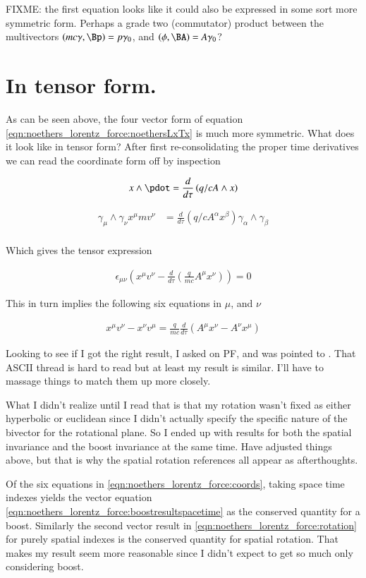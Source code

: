 FIXME: the first equation looks like it could also be expressed in some sort more symmetric form.  Perhaps a grade two (commutator) product between the multivectors $(mc\gamma, \Bp) = p \gamma_0$, and $(\phi, \BA) = A \gamma_0$?

\section{In tensor form. }

As can be seen above, the four vector form of equation \ref{eqn:noethers_lorentz_force:noethersLxTx} is much more symmetric.  What does it look like in 
tensor form?  After first re-consolidating the proper time derivatives we can read the coordinate form off by inspection

\begin{align*}
x \wedge \pdot &= \frac{d}{d\tau} \left( q/c A \wedge x \right) \\
\end{align*}

\begin{align*}
\gamma_\mu \wedge \gamma_\nu x^\mu m v^\nu &= \frac{d}{d\tau} \left( q/c A^\alpha x^\beta \right) \gamma_\alpha \wedge \gamma_\beta \\
\end{align*}

Which gives the tensor expression

\begin{align}
\epsilon_{\mu\nu} \left(x^\mu v^\nu - \frac{d}{d\tau} \left( \frac{q}{mc} A^\mu x^\nu \right) \right) = 0
\end{align}

This in turn implies the following six equations in $\mu$, and $\nu$

\begin{align}\label{eqn:noethers_lorentz_force:coords}
x^\mu v^\nu - x^\nu v^\mu = \frac{q}{mc} \frac{d}{d\tau} \left( A^\mu x^\nu - A^\nu x^\mu \right)
\end{align}

Looking to see if I got the right result, I asked on PF, and was pointed to 
\cite{BaezBoosts}.
That ASCII thread is hard to read but at least my result is similar.  I'll have to massage things to match them up more closely.

What I didn't realize until I read that is that my rotation wasn't fixed as either hyperbolic or euclidean since I didn't actually specify the specific nature of the bivector for the rotational plane.  So I ended up with results for both the spatial invariance and the boost invariance at the same time.  Have adjusted things above, but that is why the spatial rotation references all appear as afterthoughts.

Of the six equations in \ref{eqn:noethers_lorentz_force:coords}, taking space time indexes 
yields the vector equation \ref{eqn:noethers_lorentz_force:boostresultspacetime} as the conserved quantity for a boost.  Similarly
the second vector result in \ref{eqn:noethers_lorentz_force:rotation} for purely spatial indexes is the conserved quantity for spatial rotation.
That makes my result seem more reasonable since I didn't expect to get so much only considering boost.
